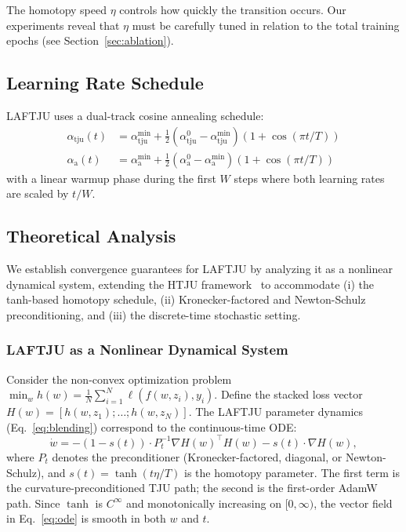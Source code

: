 \documentclass[10pt,twocolumn]{article}
\newcommand{\method}{LAFTJU}
\begin{document}
The homotopy speed $\eta$ controls how quickly the transition occurs. Our experiments reveal that $\eta$ must be carefully tuned in relation to the total training epochs (see Section~\ref{sec:ablation}).

\subsection{Learning Rate Schedule}

\method{} uses a dual-track cosine annealing schedule:
\begin{align}
\alpha_{\text{tju}}(t) &= \alpha_{\text{tju}}^{\min} + \frac{1}{2}(\alpha_{\text{tju}}^0 - \alpha_{\text{tju}}^{\min})(1 + \cos(\pi t / T)) \\
\alpha_{\text{a}}(t) &= \alpha_{\text{a}}^{\min} + \frac{1}{2}(\alpha_{\text{a}}^0 - \alpha_{\text{a}}^{\min})(1 + \cos(\pi t / T))
\end{align}
with a linear warmup phase during the first $W$ steps where both learning rates are scaled by $t/W$.

\subsection{Theoretical Analysis}
\label{sec:theory}

We establish convergence guarantees for \method{} by analyzing it as a nonlinear dynamical system, extending the HTJU framework~\cite{htju} to accommodate (i) the tanh-based homotopy schedule, (ii) Kronecker-factored and Newton-Schulz preconditioning, and (iii) the discrete-time stochastic setting.

\subsubsection{LAFTJU as a Nonlinear Dynamical System}

Consider the non-convex optimization problem $\min_w h(w) = \frac{1}{N}\sum_{i=1}^N \ell(f(w,z_i), y_i)$. Define the stacked loss vector $H(w) = [h(w,z_1); \ldots; h(w,z_N)]$. The \method{} parameter dynamics (Eq.~\eqref{eq:blending}) correspond to the continuous-time ODE:
\begin{equation}
\dot{w} = -(1-s(t)) \cdot P_t^{-1} \nabla H(w)^\top H(w) - s(t) \cdot \nabla H(w),
\label{eq:ode}
\end{equation}
where $P_t$ denotes the preconditioner (Kronecker-factored, diagonal, or Newton-Schulz), and $s(t) = \tanh(t \eta / T)$ is the homotopy parameter. The first term is the curvature-preconditioned TJU path; the second is the first-order AdamW path. Since $\tanh$ is $C^\infty$ and monotonically increasing on $[0,\infty)$, the vector field in Eq.~\eqref{eq:ode} is smooth in both $w$ and $t$.
\end{document}
